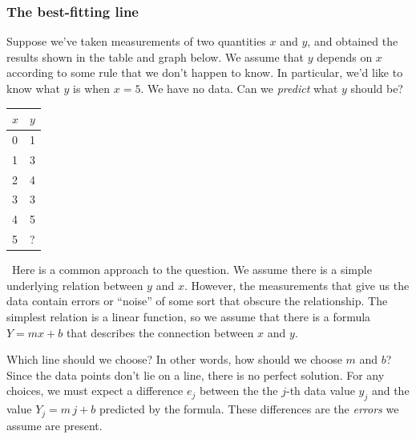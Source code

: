 {{{{\subsubsection{The best-fitting line}

        Suppose we've taken measurements of two quantities $x$ and $y$, and obtained the results shown in the table and graph below.  We assume that $y$ depends on $x$ according to some rule that we don't happen to know.  In particular, we'd like to know what $y$ is when $x = 5$.  We have no data.  Can we {\em predict\/} what $y$ should be?  
\vspace{15pt}
        
\addtolength{\tabcolsep}{10pt}
        \begin{tabular}{ll} 
        $x$ & $y$\\ [2pt]
        \hline
        0 & 1 \rule{0pt}{13pt}\\
        1 & 3 \\
        2 & 4 \\
        3 & 3 \\
        4 & 5 \\
        5 & ?
        \end{tabular}
\addtolength{\tabcolsep}{-10pt}
\vspace{20pt}

\hfill
\quad \ Here is a common approach to the question.  We assume there is a simple underlying relation between $y$ and $x$. However, the measurements that give us the data contain errors or ``noise'' of some sort that obscure the relationship.  The simplest relation is a linear function, so we assume that there is a formula $Y = mx + b$ that describes the connection between $x$ and $y$.
\vspace{3pt}


        Which line should we choose?  In other words, how should we choose $m$ and $b$?  Since the data points don't lie on a line, there is no perfect solution.  For any choices, we must expect a difference $e_j$ between the the $j$-th data value $y_j$ and the value $Y_j = m \, j + b$ predicted by the formula.  These differences are the {\em errors\/} we assume are present.  

}}}}
